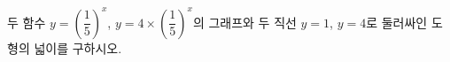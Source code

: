 두 함수 $y=\left(\dfrac{1}{5}\right)^{x}$, $y=4\times\left(\dfrac{1}{5}\right)^{x}$의 그래프와 두 직선 $y=1$, $y=4$로 둘러싸인 도형의 넓이를 구하시오.
